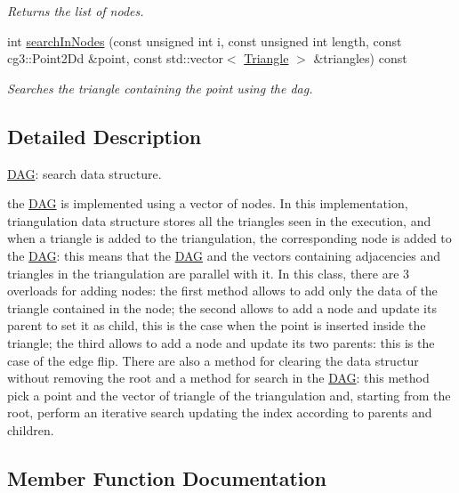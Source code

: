 \begin{DoxyCompactItemize}
\begin{DoxyCompactList}\small\item\em Returns the list of nodes. \end{DoxyCompactList}\item 
int \hyperlink{classDAG_a871ac0ced57e773b7bc8add0268159ec}{search\+In\+Nodes} (const unsigned int i, const unsigned int length, const cg3\+::\+Point2\+Dd \&point, const std\+::vector$<$ \hyperlink{classTriangle}{Triangle} $>$ \&triangles) const
\begin{DoxyCompactList}\small\item\em Searches the triangle containing the point using the dag. \end{DoxyCompactList}\end{DoxyCompactItemize}


\subsection{Detailed Description}
\hyperlink{classDAG}{D\+AG}\+: search data structure. 

the \hyperlink{classDAG}{D\+AG} is implemented using a vector of nodes. In this implementation, triangulation data structure stores all the triangles seen in the execution, and when a triangle is added to the triangulation, the corresponding node is added to the \hyperlink{classDAG}{D\+AG}\+: this means that the \hyperlink{classDAG}{D\+AG} and the vectors containing adjacencies and triangles in the triangulation are parallel with it. In this class, there are 3 overloads for adding nodes\+: the first method allows to add only the data of the triangle contained in the node; the second allows to add a node and update its parent to set it as child, this is the case when the point is inserted inside the triangle; the third allows to add a node and update its two parents\+: this is the case of the edge flip. There are also a method for clearing the data structur without removing the root and a method for search in the \hyperlink{classDAG}{D\+AG}\+: this method pick a point and the vector of triangle of the triangulation and, starting from the root, perform an iterative search updating the index according to parents and children. 

\subsection{Member Function Documentation}
\mbox{\label{classDAG_aed6fe76f8e3400755b063bc0d0152955}} 
